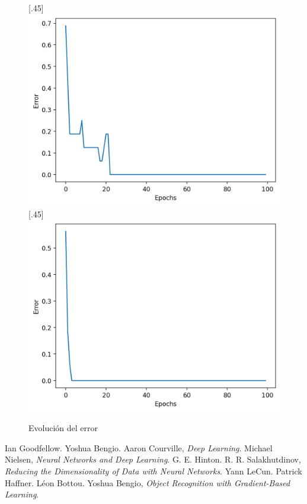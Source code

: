 \documentclass[12pt,a4paper]{article}
\begin{document}
\begin{figure}[H]
  [.45\linewidth]{
    \includegraphics[width=\linewidth]{img/5-training_error.png}
  }
  [.45\linewidth]{
    \includegraphics[width=\linewidth]{img/6-training_error.png}
  }
  \caption{Evolución del error}
  \centering
\end{figure}

\begin{thebibliography}{9}
 Ian Goodfellow. Yoshua Bengio. Aaron Courville, \emph{Deep Learning}.
 Michael Nielsen, \emph{Neural Networks and Deep Learning}.
 G. E. Hinton. R. R. Salakhutdinov, \emph{Reducing the Dimensionality of Data with Neural Networks}.
 Yann LeCun. Patrick Haffner. Léon Bottou. Yoshua Bengio, \emph{Object Recognition with Gradient-Based Learning}.

\end{thebibliography}
\end{document}
